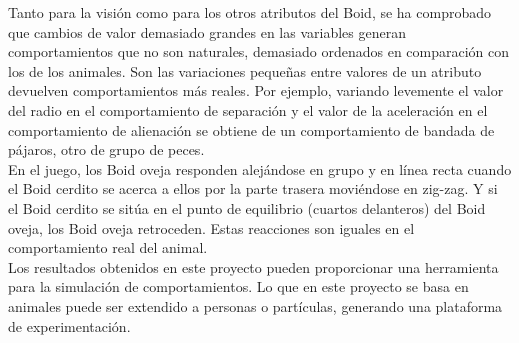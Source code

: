 Tanto para la visión como para los otros atributos del Boid, se ha comprobado que cambios de valor demasiado grandes en las variables 
generan comportamientos que no son naturales, demasiado ordenados en comparación con los de los animales. Son las variaciones
pequeñas entre valores de un atributo devuelven comportamientos más reales. Por ejemplo, variando levemente el valor del radio en el 
comportamiento de separación y el valor de la aceleración en el comportamiento de alienación se obtiene de un comportamiento de bandada 
de pájaros, otro de grupo de peces. \\

En el juego, los Boid oveja responden alejándose en grupo y en línea recta cuando el Boid cerdito se acerca a ellos
por la parte trasera moviéndose en zig-zag. Y si el Boid cerdito se sitúa en el punto de equilibrio (cuartos delanteros) del Boid oveja, 
los Boid oveja retroceden. Estas reacciones son iguales en el comportamiento real del animal.\\

Los resultados obtenidos en este proyecto pueden proporcionar una herramienta para la simulación de comportamientos. Lo que en este
proyecto se basa en animales puede ser extendido a personas o partículas, generando una plataforma de experimentación.



